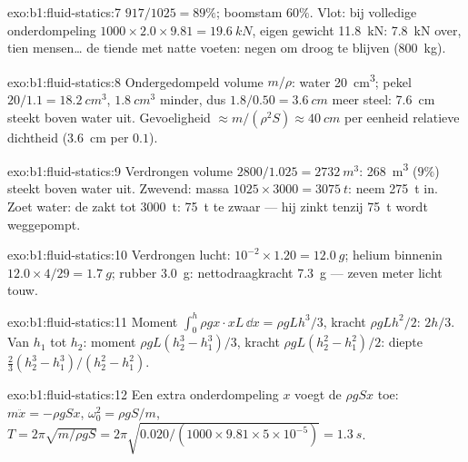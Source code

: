\begin{solution}{exo:b1:fluid-statics:7}
$917/1025 = 89\%$; boomstam $60\%$. Vlot:  bij volledige onderdompeling $1000 \times
2.0 \times 9.81 = \qty{19.6}{kN}$, eigen gewicht \qty{11.8}{kN}: \qty{7.8}{kN}
over, tien mensen\dots{} de tiende met natte voeten: negen om droog te blijven
(\qty{800}{kg}).
\end{solution}

\begin{solution}{exo:b1:fluid-statics:8}
Ondergedompeld volume $m/\rho$: water \qty{20}{cm^3}; pekel $20/1.1 = \qty{18.2}{cm^3}$,
$\qty{1.8}{cm^3}$ minder, dus $1.8/0.50 = \qty{3.6}{cm}$ meer steel: \qty{7.6}{cm}
steekt boven water uit. Gevoeligheid $\approx m/(\rho^2S) \approx \qty{40}{cm}$ per eenheid
relatieve dichtheid (\qty{3.6}{cm} per $0.1$).
\end{solution}

\begin{solution}{exo:b1:fluid-statics:9}
Verdrongen volume $2800/1.025 = \qty{2732}{m^3}$: \qty{268}{m^3} ($9\%$)
steekt boven water uit. Zwevend: massa $1025 \times 3000 = \qty{3075}{t}$: neem \qty{275}{t} in.
Zoet water: de  zakt tot \qty{3000}{t}: \qty{75}{t} te zwaar --- hij zinkt
tenzij \qty{75}{t} wordt weggepompt.
\end{solution}

\begin{solution}{exo:b1:fluid-statics:10}
Verdrongen lucht: $10^{-2} \times 1.20 = \qty{12.0}{g}$; helium binnenin $12.0 \times
4/29 = \qty{1.7}{g}$; rubber \qty{3.0}{g}: nettodraagkracht \qty{7.3}{g} --- zeven meter
licht touw.
\end{solution}

\begin{solution}{exo:b1:fluid-statics:11}
Moment $\int_0^h\rho gx\cdot xL\,\dd x = \rho gLh^3/3$, kracht $\rho gLh^2/2$:
 $2h/3$. Van $h_1$ tot $h_2$: moment $\rho gL(h_2^3 - h_1^3)/3$, kracht
$\rho gL(h_2^2 - h_1^2)/2$: diepte $\frac23(h_2^3 - h_1^3)/(h_2^2 - h_1^2)$.
\end{solution}

\begin{solution}{exo:b1:fluid-statics:12}
Een extra onderdompeling $x$ voegt de  $\rho gSx$ toe: $m\ddot x = -\rho gSx$,
$\omega_0^2 = \rho gS/m$, $T = 2\pi\sqrt{m/\rho gS} = 2\pi\sqrt{0.020/(1000 \times
9.81 \times 5\times10^{-5})} = \qty{1.3}{s}$.
\end{solution}

